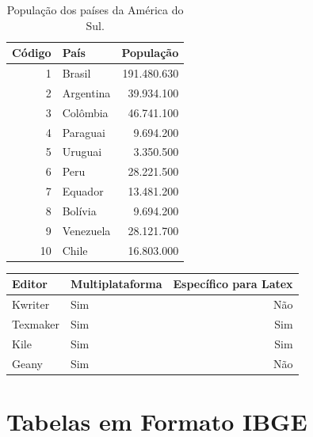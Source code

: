 \documentclass{templateppgmo}
\numberwithin{figure}{chapter}
\numberwithin{table}{chapter}
\numberwithin{quadro}{chapter}
\numberwithin{algoritmo}{chapter}
\numberwithin{codigo}{chapter}
\begin{document}
\begin{table}[H]
\centering
\caption{População dos países da América do Sul.} \label{tabela:populacao_america_sul}
\begin{tabular}{r|l|r}        \hline
Código  & País            & População   \\ \hline
1       & Brasil          & 191.480.630 \\
2       & Argentina       &  39.934.100 \\
3       & Colômbia        &  46.741.100 \\
4       & Paraguai        &   9.694.200 \\
5       & Uruguai         &   3.350.500 \\
6       & Peru            &  28.221.500 \\
7       & Equador         &  13.481.200 \\
8       & Bolívia         &   9.694.200 \\
9       & Venezuela       &  28.121.700 \\
10      & Chile           &  16.803.000 \\ \hline
\end{tabular}

\end{table}

\begin{quadro}[htb]
\centering
\caption{Editores de Texto Livres.} \label{quadro:editores_texto_livres}
\begin{tabular}{|l|l|r|}        \hline
Editor     & Multiplataforma & Específico para Latex \\ \hline
Kwriter    & Sim             & Não                   \\
Texmaker   & Sim             & Sim                   \\
Kile       & Sim             & Sim                   \\
Geany      & Sim             & Não                   \\ \hline
\end{tabular}

\end{quadro}



\section{Tabelas em Formato IBGE}
\end{document}
